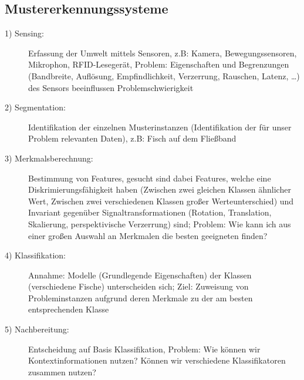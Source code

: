 \documentclass{article} %
\begin{document}
	\subsection{Mustererkennungssysteme}
		\begin{description}
			\item[1) Sensing:] Erfassung der Umwelt mittels Sensoren, z.B: Kamera, Bewegungssensoren, Mikrophon, RFID-Lesegerät, Problem: Eigenschaften und Begrenzungen (Bandbreite, Auflösung, Empfindlichkeit, Verzerrung, Rauschen, Latenz, \dots) des Sensors beeinflussen Problemschwierigkeit 			
			\item[2) Segmentation:] Identifikation der einzelnen Musterinstanzen (Identifikation der für unser Problem relevanten Daten), z.B: Fisch auf dem Fließband
			\item[3) Merkmalsberechnung:] Bestimmung von Features, gesucht sind dabei Features, welche eine Diskrimierungsfähigkeit haben (Zwischen zwei gleichen Klassen ähnlicher Wert, Zwischen zwei verschiedenen Klassen großer Werteunterschied) und Invariant gegenüber Signaltransformationen (Rotation, Translation, Skalierung, perspektivische Verzerrung) sind; Problem: Wie kann ich aus einer großen Auswahl an Merkmalen die besten geeigneten finden?
			\item[4) Klassifikation:] Annahme: Modelle (Grundlegende Eigenschaften) der Klassen (verschiedene Fische) unterscheiden sich; Ziel: Zuweisung von Probleminstanzen aufgrund deren Merkmale zu der am besten entsprechenden Klasse			
			\item[5) Nachbereitung:] Entscheidung auf Basis Klassifikation, Problem: Wie können wir Kontextinformationen nutzen? Können wir verschiedene Klassifikatoren zusammen nutzen? 
		\end{description}
\end{document}
